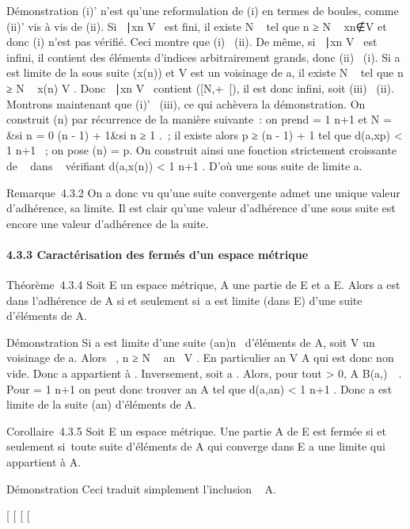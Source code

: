 Démonstration (i)' n'est qu'une reformulation de (i) en termes de
boules, comme (ii)' vis à vis de (ii). Si \n \in
{}~∣xn \in V \ est
fini, il existe N \in {}~ tel que n ≥ N \rigtharrow~
xn∉V et donc (i) n'est pas vérifié.
Ceci montre que (i) \rigtharrow~(ii). De même, si \n \in
{}~∣xn \in V \ est
infini, il contient des éléments d'indices arbitrairement grands, donc
(ii) \rigtharrow~(i). Si a est limite de la sous suite (x\phi(n)) et V est
un voisinage de a, il existe N \in {}~ tel que n ≥ N \rigtharrow~ x\phi(n) \in V .
Donc \n \in {}~∣xn \in V
\ contient \phi({[}N,+\infty~{[}), il est donc infini, soit
(iii) \rigtharrow~(ii). Montrons maintenant que (i)' \rigtharrow~(iii), ce qui achèvera la
démonstration. On construit \phi(n) par récurrence de la manière suivante~:
on prend \epsilon = 1 \over n+1 et N = \left
\  &si n = 0
\cr \phi(n - 1) + 1&si n ≥ 1 \cr 
\right .~; il existe alors p ≥ \phi(n - 1) + 1 tel que
d(a,xp) \textless{} 1 \over n+1 ~; on pose
\phi(n) = p. On construit ainsi une fonction strictement croissante de ~
dans ~ vérifiant d(a,x\phi(n)) \textless{} 1
\over n+1 . D'où une sous suite de limite a.

Remarque~4.3.2 On a donc vu qu'une suite convergente admet une unique
valeur d'adhérence, sa limite. Il est clair qu'une valeur d'adhérence
d'une sous suite est encore une valeur d'adhérence de la suite.

\paragraph{4.3.3 Caractérisation des fermés d'un espace métrique}

Théorème~4.3.4 Soit E un espace métrique, A une partie de E et a \in E.
Alors a est dans l'adhérence de A si et seulement si~a est limite (dans
E) d'une suite d'éléments de A.

Démonstration Si a est limite d'une suite (an)n\in{}~
d'éléments de A, soit V un voisinage de a. Alors
\existsN \in {}~, n ≥ N \rigtharrow~ an~ \in V . En
particulier an \in V \bigcap A qui est donc non vide. Donc a
appartient à \overlineA. Inversement, soit a
\in\overlineA. Alors, pour tout \epsilon \textgreater{} 0, A \bigcap
B(a,\epsilon)\neq~\varnothing~. Pour \epsilon = 1 \over
n+1 on peut donc trouver an \in A tel que d(a,an)
\textless{} 1 \over n+1 . Donc a est limite de la
suite (an) d'éléments de A.

Corollaire~4.3.5 Soit E un espace métrique. Une partie A de E est fermée
si et seulement si~toute suite d'éléments de A qui converge dans E a une
limite qui appartient à A.

Démonstration Ceci traduit simplement l'inclusion
\overlineA \subset~ A.

{[}
{[}
{[}
{[}
